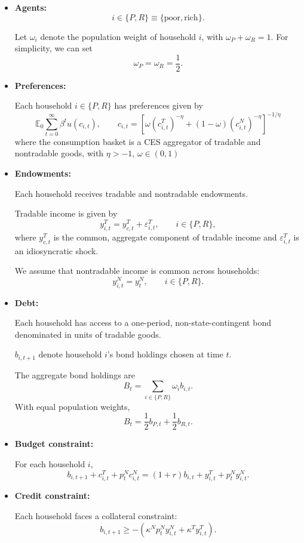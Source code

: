 \documentclass[11pt]{article}
\begin{document}
\begin{itemize}
    \item \textbf{Agents:}
\[
i\in\{P,R\}
\equiv
\{\text{poor},\text{rich}\}.
\]

Let $\omega_i$ denote the population weight of household $i$, with $\omega_P+\omega_R=1$. For simplicity, we can set
\[
\omega_P=\omega_R=\frac{1}{2}.
\]

\item \textbf{Preferences:}

Each household $i\in\{P,R\}$ has preferences given by
\[
\mathbb{E}_0
\sum_{t=0}^{\infty}
\beta^t u(c_{i,t}), \qquad c_{i,t}
=
\left[
\omega (c_{i,t}^{T})^{-\eta}
+
(1-\omega)(c_{i,t}^{N})^{-\eta}
\right]^{-1/\eta}
\]
where the consumption basket is a CES aggregator of tradable and
nontradable goods, with $\eta>-1$, $\omega\in(0,1)$

\item \textbf{Endowments:}

Each household receives tradable and nontradable endowments.

Tradable income is given by
\[
y_{i,t}^{T}
=
y_{c,t}^{T}
+
\varepsilon_{i,t}^{T},
\qquad
i\in\{P,R\},
\]
where $y_{c,t}^{T}$ is the common, aggregate component of tradable income and
$\varepsilon_{i,t}^{T}$ is an idiosyncratic shock.

We assume that nontradable income is common across households:
\[
y_{i,t}^{N}=y_t^{N},
\qquad
i\in\{P,R\}.
\]

\item \textbf{Debt:}

Each household has access to a one-period, non-state-contingent bond
denominated in units of tradable goods.

$b_{i,t+1}$ denote household $i$'s bond holdings chosen at time $t$.

The aggregate bond holdings are
\[
B_t
=
\sum_{i\in\{P,R\}}
\omega_i b_{i,t}.
\]
With equal population weights,
\[
B_t
=
\frac{1}{2}b_{P,t}
+
\frac{1}{2}b_{R,t}.
\]

\item \textbf{Budget constraint:}

For each household $i$,
\[
b_{i,t+1}
+
c_{i,t}^{T}
+
p_t^N c_{i,t}^{N}
=
(1+r)b_{i,t}
+
y_{i,t}^{T}
+
p_t^N y_{i,t}^{N}.
\]

\item \textbf{Credit constraint:}

Each household faces a collateral constraint:
\[
b_{i,t+1}
\geq
-
\left(
\kappa^N p_t^N y_{i,t}^{N}
+
\kappa^T y_{i,t}^{T}
\right).
\]
\end{itemize}
\end{document}

